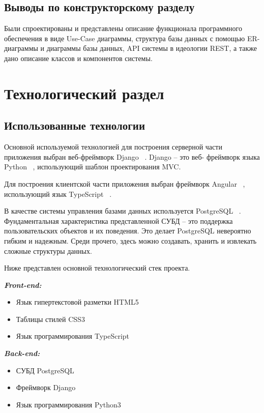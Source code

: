 \documentclass[a4paper,14pt]{extarticle}
\begin{document}
 	\subsection*{Выводы по конструкторскому разделу}
 	
 	Были спроектированы и представлены описание функционала программного обеспечения в виде Use-Case диаграммы, структура базы данных с помощью ER-диаграммы и диаграммы базы данных, API системы в идеологии REST, а также дано описание классов и компонентов системы.
 	
 	\newpage
 	
 	\section{Технологический раздел}
 	
 	\subsection{Использованные технологии}
 	
 	Основной используемой технологией для построения серверной части приложения выбран веб-фреймворк Django ~\cite{django}. Django – это веб- фреймворк языка Python ~\cite{python}, использующий шаблон проектирования MVC.
 	
 	Для построения клиентской части приложения выбран фреймворк Angular ~\cite{angular}, использующий язык TypeScript ~\cite{ts}.
 	
 	В качестве системы управления базами данных используется PostgreSQL ~\cite{postgresql}. Фундаментальная характеристика представленной СУБД – это поддержка пользовательских объектов и их поведения. Это делает PostgreSQL невероятно гибким и надежным. Среди прочего, здесь можно создавать, хранить и извлекать сложные структуры данных.
 	
 	Ниже представлен основной технологический стек проекта.
 	
 	\textit{\bf Front-end:}
 	\begin{itemize}
 		\item Язык гипертекстовой разметки HTML5\cite{html}
 		\item Таблицы стилей CSS3\cite{css}
 		\item Язык программирования TypeScript\cite{ts}
 	\end{itemize}
 	
 	\textit{\bf Back-end:}
 	\begin{itemize}
 		\item СУБД PostgreSQL\cite{postgresql}
 		\item Фреймворк Django\cite{django}
 		\item Язык программирования Python3\cite{python}
 	\end{itemize}
 
\end{document}
